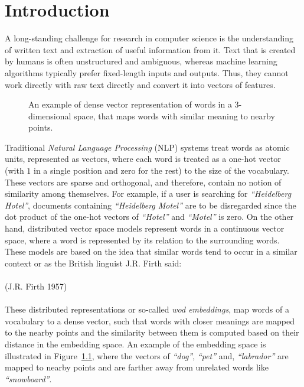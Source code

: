 \chapter{Introduction}\label{chap:intro}
A long-standing challenge for research in computer science is the understanding of written text and extraction of useful information from it. Text that is created by humans is often unstructured and ambiguous, whereas machine learning algorithms typically prefer fixed-length inputs and outputs. Thus, they cannot work directly with raw text directly and convert it into vectors of features.
\\
\begin{figure}
\centering 
\resizebox{0.3\textwidth}{0.25\textwidth}{      

}
\caption{An example of dense vector representation of words in a 3-dimensional space, that maps words with similar meaning to nearby points.}
\label{fig:vsmodels}
\end{figure}
Traditional \emph{Natural Language Processing} (NLP) systems treat words as atomic units, represented as vectors, where each word is treated as a one-hot vector (with $1$ in a single position and zero for the rest) to the size of the vocabulary. These vectors are sparse and orthogonal, and therefore, contain no notion of similarity among themselves. For example, if a user is searching for \emph{``Heidelberg Hotel''}, documents containing \emph{``Heidelberg Motel''} are to be disregarded since the dot product of the one-hot vectors of \emph{``Hotel''} and \emph{``Motel''} is zero. On the other hand, distributed vector space models represent words in a continuous vector space, where a word is represented by its relation to the surrounding words. These models are based on the idea that similar words tend to occur in a similar context or as the British linguist J.R. Firth said:\\ \\
\noindent
{} (J.R. Firth 1957)\\
\\
These distributed representations or so-called \emph{wod embeddings}, map words of a vocabulary to a dense vector, such that words with closer meanings are mapped to the nearby points and the similarity between them is computed based on their distance in the embedding space. An example of the embedding space is illustrated in Figure~\ref{fig:vsmodels}, where the vectors of \emph{``dog''},  \emph{``pet''} and, \emph{``labrador''} are mapped to nearby points and are farther away from unrelated words like \emph{``snowboard''}.\\
